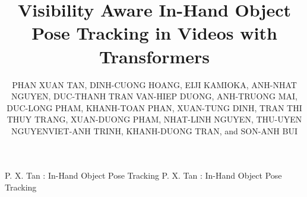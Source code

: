 \documentclass{ieeeaccess}
\providecommand{\DIFadd}[1]{{\protect\color{blue} \sf #1}} %
\providecommand{\DIFaddbegin}{} %
\providecommand{\DIFaddend}{} %
\newcommand{\DIFaddincludegraphics}[2][]{{\color{blue}\fbox{\DIFOincludegraphics[#1]{#2}}}} %
\DeclareRobustCommand{\DIFaddbegin}{\DIFOaddbegin \let\includegraphics\DIFaddincludegraphics} %
\DeclareRobustCommand{\DIFaddend}{\DIFOaddend \let\includegraphics\DIFOincludegraphics} %
\begin{document}

\title{Visibility Aware In-Hand Object Pose Tracking in Videos with Transformers}

\author{\uppercase{Phan Xuan Tan},
\uppercase{Dinh-Cuong Hoang},
\uppercase{Eiji Kamioka},
\uppercase{Anh-Nhat Nguyen},
\uppercase{Duc-Thanh Tran}
\uppercase{Van-Hiep Duong},
\uppercase{Anh-Truong Mai},
\uppercase{Duc-Long Pham},
\uppercase{Khanh-Toan Phan},
\uppercase{Xuan-Tung Dinh},
\uppercase{Tran Thi Thuy Trang},
\uppercase{Xuan-Duong Pham},
\uppercase{Nhat-Linh Nguyen},
\DIFaddbegin \uppercase{Thu-Uyen Nguyen}\authorrefmark{3}\DIFadd{,
}\DIFaddend \uppercase{Viet-Anh Trinh},
\uppercase{Khanh-Duong Tran}, and
\uppercase{Son-Anh Bui}}

\address[1]{College of Engineering, Shibaura Institute of Technology, Tokyo 135-8548, Japan}
\address[2]{Greenwich Vietnam, FPT University, Hanoi, 10000, Vietnam}
\address[3]{IT Department, FPT University, Hanoi, 10000, Vietnam}


\markboth
{P. X. Tan \headeretal: In-Hand Object Pose Tracking}
{P. X. Tan \headeretal: In-Hand Object Pose Tracking}

\end{document}
